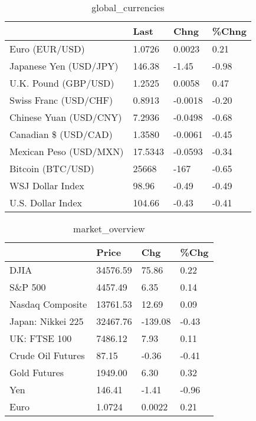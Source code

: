 \documentclass{article}%
\begin{document}
%


\begin{table}[htbp]%
\caption{global\_currencies}%
\centering%
\begin{adjustbox}{width=1\textwidth}%
\begin{tabular}{llll}
\toprule
                       &    Last &    Chng & \%Chng \\
\midrule
        Euro (EUR/USD) &  1.0726 &  0.0023 &  0.21 \\
Japanese Yen (USD/JPY) &  146.38 &   -1.45 & -0.98 \\
  U.K. Pound (GBP/USD) &  1.2525 &  0.0058 &  0.47 \\
 Swiss Franc (USD/CHF) &  0.8913 & -0.0018 & -0.20 \\
Chinese Yuan (USD/CNY) &  7.2936 & -0.0498 & -0.68 \\
  Canadian \$ (USD/CAD) &  1.3580 & -0.0061 & -0.45 \\
Mexican Peso (USD/MXN) & 17.5343 & -0.0593 & -0.34 \\
     Bitcoin (BTC/USD) &   25668 &    -167 & -0.65 \\
      WSJ Dollar Index &   98.96 &   -0.49 & -0.49 \\
     U.S. Dollar Index &  104.66 &   -0.43 & -0.41 \\
\bottomrule
\end{tabular}
%
\end{adjustbox}%
\end{table}

%


\begin{table}[htbp]%
\caption{market\_overview}%
\centering%
\begin{adjustbox}{width=1\textwidth}%
\begin{tabular}{llll}
\toprule
                  &    Price &     Chg &  \%Chg \\
\midrule
             DJIA & 34576.59 &   75.86 &  0.22 \\
          S\&P 500 &  4457.49 &    6.35 &  0.14 \\
 Nasdaq Composite & 13761.53 &   12.69 &  0.09 \\
Japan: Nikkei 225 & 32467.76 & -139.08 & -0.43 \\
     UK: FTSE 100 &  7486.12 &    7.93 &  0.11 \\
Crude Oil Futures &    87.15 &   -0.36 & -0.41 \\
     Gold Futures &  1949.00 &    6.30 &  0.32 \\
              Yen &   146.41 &   -1.41 & -0.96 \\
             Euro &   1.0724 &  0.0022 &  0.21 \\
\bottomrule
\end{tabular}
%
\end{adjustbox}%
\end{table}

%
\end{document}
